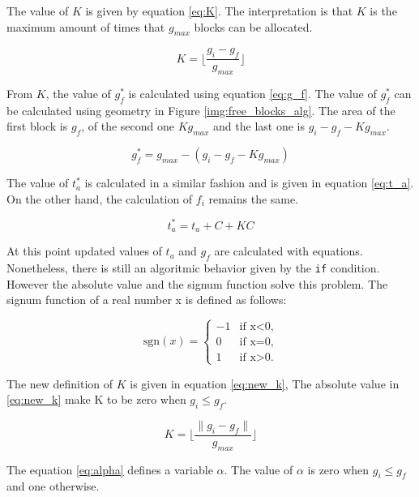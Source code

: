 \documentclass[
  12pt,
  a4paperpaper,
]{report}
\begin{document}
The value of \(K\) is given by equation \ref{eq:K}. The
interpretation is that \(K\) is the maximum amount of times that
\(g_{max}\) blocks can be allocated.

\begin{equation}
K = \lfloor \frac{g_i - g_f}{g_{max}} \rfloor
\label{eq:K}
\end{equation}

From \(K\), the value of \(g^{*}_f\) is calculated using equation \ref{eq:g_f}. 
The value of \(g^{*}_f\) can be calculated using geometry in Figure \ref{img:free_blocks_alg}.
The area of the first block is \(g_f\), of the second one \(Kg_{max}\) and the last one is \(g_i - g_f - K g_{max}\).

\begin{equation}
g^{*}_f = g_{max} - (g_i -  g_f - K g_{max} )
\label{eq:g_f}
\end{equation}

The value of \(t^{*}_a\) is calculated in a similar fashion and is given
in equation \ref{eq:t_a}. On the other hand, the calculation of \(f_i\)
remains the same.

\begin{equation}
t^{*}_a = t_a + C+ KC
\label{eq:t_a}
\end{equation}

At this point updated values of \(t_a\) and \(g_f\) are calculated with equations.
Nonetheless, there is still an algoritmic behavior given by the \texttt{if} condition. 
However the absolute value and the signum function solve this problem. 
The signum function of a real number x is defined as follows:

\begin{equation}
\mathrm{sgn}(x)=
    \begin{cases}
        -1  & \text{if    x<0,}\\
        0   & \text{if    x=0,}\\
        1   & \text{if    x>0.}
    \end{cases} 
\end{equation}

The new definition of  \(K\) is given in equation \ref{eq:new_k},
The absolute value in \ref{eq:new_k} make K to be zero when \(g_i \leq g_f\).

\begin{equation}
K = \lfloor \frac{ \| g_i - g_f \|}{g_{max}} \rfloor
\label{eq:new_k}
\end{equation}

The equation \ref{eq:alpha} defines a variable \(\alpha\).
The value of \(\alpha\) is zero when \(g_i \leq g_f\) and one otherwise.
\end{document}
